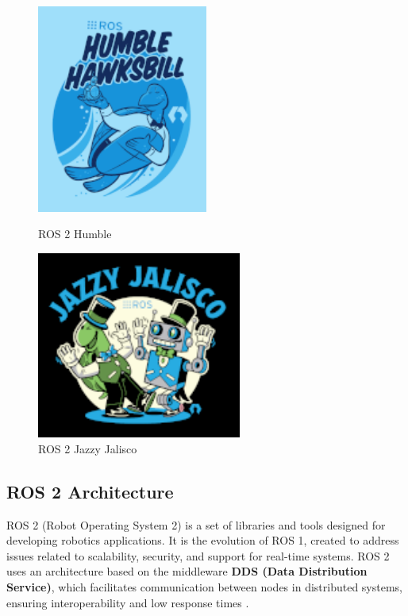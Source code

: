 \begin{figure}[h!]
    \centering
    \begin{minipage}{0.45\textwidth}
        \centering
        \includegraphics[width=0.5\textwidth]{pictures/humble_logo.png}
        \caption{ROS 2 Humble}
        \label{fig:imagen1}
    \end{minipage}
    \hfill
    \begin{minipage}{0.45\textwidth}
        \centering
        \includegraphics[width=0.6\textwidth]{pictures/jazzy_logo.png}
        \caption{ROS 2 Jazzy Jalisco}
        \label{fig:imagen2}
    \end{minipage}
\end{figure}

\subsection{ROS 2 Architecture}

    ROS 2 (Robot Operating System 2) is a set of libraries and tools designed for developing robotics applications. It is the evolution of ROS 1, created to address issues related to scalability, security, and support for real-time systems. ROS 2 uses an architecture based on the middleware \textbf{DDS (Data Distribution Service)}, which facilitates communication between nodes in distributed systems, ensuring interoperability and low response times \cite{ros_docs}.  
    

